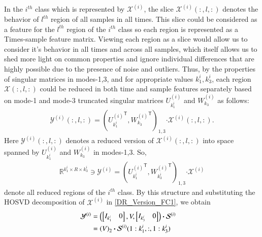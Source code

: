 \documentclass[preprint,12pt]{elsarticle}
\newcommand{\trans}{\mathsf{T}}
\begin{document}
	In the $i^{th}$ class which is represented by $\mathcal{X}^{(i)}$, the slice $\mathcal{X}^{(i)}(:,l,:)$ denotes
	the  behavior of $l^{th}$  region of all samples in all times.    
	This slice could be considered as a feature for the $l^{th}$ region of the $i^{th}$ class so each region is represented as a  Times-sample feature matrix. Viewing each region as a slice would allow us to consider it's behavior in all times and across all samples, which itself allows us to shed more light on common properties and ignore individual differences that are highly possible due to the presence of noise and outliers.
	Thus, by the properties of singular matrices in modes-1,3, and for appropriate values
	$k_1^i,k_3^i$, each region $\mathcal{X}(:,l,:)$ could be reduced in both time and sample features separately
	based on mode-1 and mode-3 truncated singular matrices $U_{k_1^i}^{(i)}$ and $W_{k_3}^{(i)}$
	as follows: 
	\begin{eqnarray}
	\mathcal{Y}^{(i)}(:,l,:) = \left( 
	{U_{k_1^i}^{(i)}}^{\trans},  {W_{k_3}^{(i)}}^{\trans} 
	\right)_{1,3} \boldsymbol{\cdot} \mathcal{X}^{(i)}(:,l,:).
	\end{eqnarray}
	Here $\mathcal{Y}^{(i)}(:,l,:)$  denotes a reduced version of $\mathcal{X}^{(i)}(:,l,:)$ into space
	spanned by $U_{k_1^i}^{(i)}$ and $W_{k_3}^{(i)}$ in modes-1,3. So,
	\begin{align}
	\mathbb{R}^{k_1^i \times R \times k_3^i} \ni  {{\mathcal{Y}^{(i)}}} = \left( 
	{U_{k_1^i}^{(i)}}^{\trans}, {W_{k^i_3}^{(i)}}^{\trans} 
	\right)_{1,3}\boldsymbol{\cdot} \mathcal{X}^{(i)} \label{DR_Version_FC1}
	\end{align} 
	denote all reduced regions of the $i^{th}$ class. By this structure  and substituting the HOSVD decomposition of $\mathcal{X}^{(i)}$ in \eqref{DR_Version_FC1},  we obtain
	\begin{align}
	{\mathcal{Y}}^{(i)}&=  \notag
	\left(
	\begin{bmatrix}
	I_{k_1^i} &  0
	\end{bmatrix},
	V,
	\begin{bmatrix}
	I_{k_3^i} &  0
	\end{bmatrix}
	\right)\boldsymbol{\cdot} \mathcal{S}^{(i)} \notag
	\\&=\left( 
	V
	\right)_{2} \boldsymbol{\cdot} \mathcal{S}^{(i)}(1:k_1^i,:, 1:k_3^i) \notag &
	\end{align}
\end{document}

